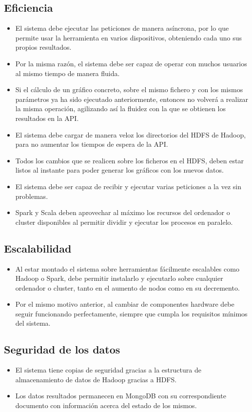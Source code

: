 \subsection{Eficiencia}
\begin{itemize}
	\item El sistema debe ejecutar las peticiones de manera asíncrona, por lo que permite usar la herramienta en varios dispositivos, obteniendo cada uno sus propios resultados.
	\item Por la misma razón, el sistema debe ser capaz de operar con muchos usuarios al mismo tiempo de manera fluida.
	\item Si el cálculo de un gráfico concreto, sobre el mismo fichero y con los mismos parámetros ya ha sido ejecutado anteriormente, entonces no volverá a realizar la misma operación, agilizando así la fluidez con la que se obtienen los resultados en la API.
	\item El sistema debe cargar de manera veloz los directorios del HDFS de Hadoop, para no aumentar los tiempos de espera de la API.
	\item Todos los cambios que se realicen sobre los ficheros en el HDFS, deben estar listos al instante para poder generar los gráficos con los nuevos datos.
	\item El sistema debe ser capaz de recibir y ejecutar varias peticiones a la vez sin problemas.
	\item Spark y Scala deben aprovechar al máximo los recursos del ordenador o cluster disponibles al permitir dividir y ejecutar los procesos en paralelo.
\end{itemize}

\subsection{Escalabilidad}
\begin{itemize}
	\item Al estar montado el sistema sobre herramientas fácilmente escalables como Hadoop o Spark, debe permitir instalarlo y ejecutarlo sobre cualquier ordenador o cluster, tanto en el aumento de nodos como en su decremento.
	\item Por el mismo motivo anterior, al cambiar de componentes hardware debe seguir funcionando perfectamente, siempre que cumpla los requisitos mínimos del sistema.
\end{itemize}

\subsection{Seguridad de los datos}
\begin{itemize}
	\item El sistema tiene copias de seguridad gracias a la estructura de almacenamiento de datos de Hadoop gracias a HDFS.
	\item Los datos resultados permanecen en MongoDB con su correspondiente documento con información acerca del estado de los mismos.
\end{itemize}

